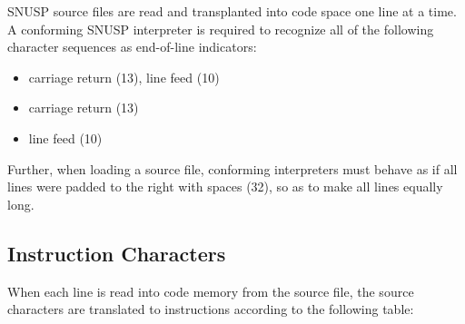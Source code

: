 \documentclass[a4paper]{article}
\begin{document}
\textsc{SNUSP} source files are read and transplanted into code space one line
at a time.  A conforming \textsc{SNUSP} interpreter is required to recognize
all of the following character sequences as end-of-line indicators:

\begin{itemize}

\item carriage return (13), line feed (10)

\item carriage return (13)

\item line feed (10)

\end{itemize}

Further, when loading a source file, conforming interpreters must behave as if
all lines were padded to the right with spaces (32), so as to make all lines
equally long.



\subsection{Instruction Characters}

When each line is read into code memory from the source file, the source
characters are translated to instructions according to the following table:
\end{document}
